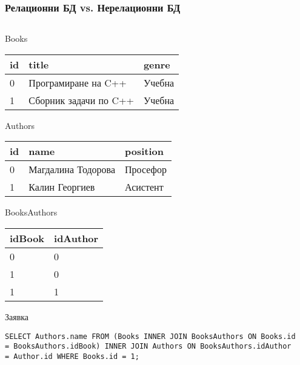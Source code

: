 \documentclass{beamer}
\begin{document}
\begin{frame}[fragile]
\frametitle{Релационни БД vs. Нерелационни БД}

\begin{columns}[t]
  \begin{column}{0.4\textwidth}




Books

\begin{tabular}{l l l}
id & title & genre \\ \hline
0 & Програмиране на C++ & Учебна \\
1 & Сборник задачи по C++ & Учебна
\end{tabular}

\vspace{0.2cm}

Authors

\begin{tabular}{l l l}
id & name & position \\ \hline
0 & Магдалина Тодорова &  Просефор \\
1 & Калин Георгиев & Асистент
\end{tabular}


\vspace{0.2cm}

BooksAuthors

\begin{tabular}{l l}
idBook & idAuthor \\ \hline
0 & 0 \\
1 & 0 \\
1 & 1
\end{tabular}

\pause

\vspace{0.2cm}
Заявка


\begin{lstlisting}[breaklines=true]
SELECT Authors.name FROM (Books INNER JOIN BooksAuthors ON Books.id = BooksAuthors.idBook) INNER JOIN Authors ON BooksAuthors.idAuthor = Author.id WHERE Books.id = 1;
\end{lstlisting}

\end{column}

\pause

\begin{column}{0.5\textwidth}


\end{column}
\end{columns}
\end{frame}
\end{document}

